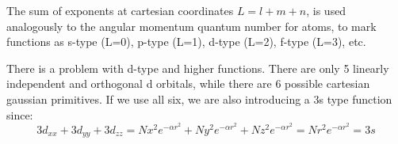 The sum of exponents at cartesian coordinates $L = l+m+n$, is used
analogously to the angular momentum quantum number for atoms, to mark
functions as s-type (L=0), p-type (L=1), d-type (L=2), f-type (L=3),
etc.

There is a problem with d-type and higher functions. There are only 5
linearly independent and orthogonal d orbitals, while there are 6
possible cartesian gaussian primitives. If we use all six, we are also
introducing a 3s type function since:
\begin{equation}\label{}
  3d_{xx}+3d_{yy}+3d_{zz} = Nx^{2}e^{-\alpha r^{2}} + Ny^{2}e^{-\alpha
    r^{2}} + Nz^{2}e^{-\alpha r^{2}} = Nr^{2}e^{-\alpha r^{2}} = 3s
\end{equation}



